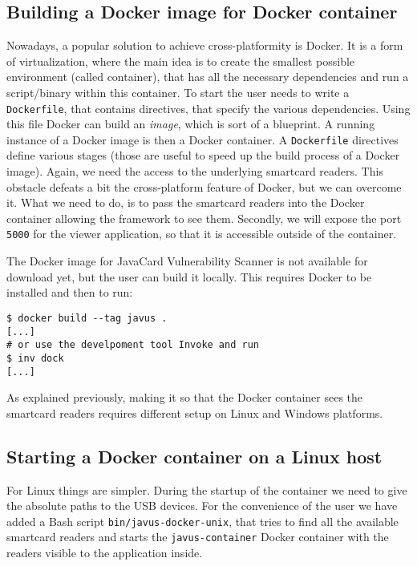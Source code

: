         \subsection{Building a Docker image for Docker container}\label{subsec:dock-build}
        Nowadays, a popular solution to achieve cross-platformity is Docker.  It is a form of virtualization, where the main idea is to create the smallest possible environment (called container), that has all the necessary dependencies and run a script/binary within this container. To start the user needs to write a \texttt{Dockerfile}, that contains directives, that specify the various dependencies. Using this file Docker can build an \textit{image}, which is sort of a blueprint. A running instance of a Docker image is then a Docker container. A \texttt{Dockerfile} directives define various stages (those are useful to speed up the build process of a Docker image). Again, we need the access to the underlying smartcard readers. This obstacle defeats a bit the cross-platform feature of Docker, but we can overcome it. What we need to do, is to pass the smartcard readers into the Docker container allowing the framework to see them. Secondly, we will expose the port \texttt{5000} for the viewer application, so that it is accessible outside of the container.

        The Docker image for JavaCard Vulnerability Scanner is not available for download yet, but the user can build it locally. This requires Docker to be installed and then to run:
        \begin{verbatim}
$ docker build --tag javus .
[...]
# or use the develpoment tool Invoke and run
$ inv dock
[...]
        \end{verbatim}

        As explained previously, making it so that the Docker container sees the smartcard readers requires different setup on Linux and Windows platforms.

        \subsection{Starting a Docker container on a Linux host}\label{subsec:inv-docker-unix}
        For Linux things are simpler. During the startup of the container we need to give the absolute paths to the USB devices. For the convenience of the user we have added a Bash script \texttt{bin/javus-docker-unix}, that tries to find all the available smartcard readers and starts the \texttt{javus-container} Docker container with the readers visible to the application inside.



